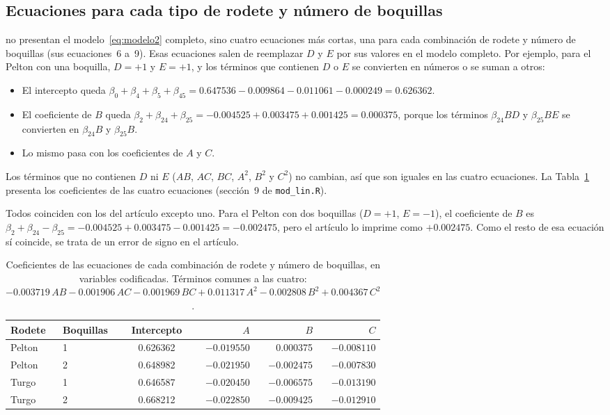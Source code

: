 \subsection{Ecuaciones para cada tipo de rodete y número de boquillas}

\citet{Lakdawala2025} no presentan el modelo~\eqref{eq:modelo2} completo, sino cuatro ecuaciones más cortas, una para cada combinación de rodete y número de boquillas (sus ecuaciones~6 a~9). Esas ecuaciones salen de reemplazar $D$ y $E$ por sus valores en el modelo completo. Por ejemplo, para el Pelton con una boquilla, $D = +1$ y $E = +1$, y los términos que contienen $D$ o $E$ se convierten en números o se suman a otros:
\begin{itemize}
  \item El intercepto queda $\beta_0 + \beta_4 + \beta_5 + \beta_{45} = 0.647536 - 0.009864 - 0.011061 - 0.000249 = 0.626362$.
  \item El coeficiente de $B$ queda $\beta_2 + \beta_{24} + \beta_{25} = -0.004525 + 0.003475 + 0.001425 = 0.000375$, porque los términos $\beta_{24}BD$ y $\beta_{25}BE$ se convierten en $\beta_{24}B$ y $\beta_{25}B$.
  \item Lo mismo pasa con los coeficientes de $A$ y $C$.
\end{itemize}
Los términos que no contienen $D$ ni $E$ ($AB$, $AC$, $BC$, $A^2$, $B^2$ y $C^2$) no cambian, así que son iguales en las cuatro ecuaciones. La Tabla~\ref{tab:ecuaciones} presenta los coeficientes de las cuatro ecuaciones (sección~9 de \texttt{mod\_lin.R}).

Todos coinciden con los del artículo excepto uno. Para el Pelton con dos boquillas ($D = +1$, $E = -1$), el coeficiente de $B$ es $\beta_2 + \beta_{24} - \beta_{25} = -0.004525 + 0.003475 - 0.001425 = -0.002475$, pero el artículo lo imprime como $+0.002475$. Como el resto de esa ecuación sí coincide, se trata de un error de signo en el artículo.

\begin{table}[ht]
\centering
\caption{Coeficientes de las ecuaciones de cada combinación de rodete y número de boquillas, en variables codificadas. Términos comunes a las cuatro: $-0.003719\,AB - 0.001906\,AC - 0.001969\,BC + 0.011317\,A^2 - 0.002808\,B^2 + 0.004367\,C^2$.}
\label{tab:ecuaciones}
\begin{tabular}{llcrrr}
\toprule
Rodete & Boquillas & Intercepto & $A$ & $B$ & $C$ \\
\midrule
Pelton & 1 & 0.626362 & $-0.019550$ &  0.000375 & $-0.008110$ \\
Pelton & 2 & 0.648982 & $-0.021950$ & $-0.002475$ & $-0.007830$ \\
Turgo  & 1 & 0.646587 & $-0.020450$ & $-0.006575$ & $-0.013190$ \\
Turgo  & 2 & 0.668212 & $-0.022850$ & $-0.009425$ & $-0.012910$ \\
\bottomrule
\end{tabular}
\end{table}

